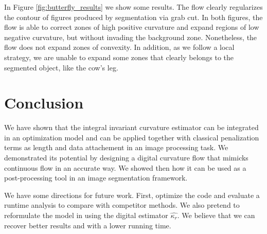 \documentclass[runningheads]{llncs}
\begin{document}
In Figure \ref{fig:butterfly_results} we show some results. The flow clearly regularizes the contour of figures produced by segmentation via grab cut. In both figures, the flow is able to correct zones of high positive curvature and expand regions of low negative curvature, but without invading the background zone. Nonetheless, the flow does not expand zones of convexity. In addition, as we follow a local strategy, we are unable to expand some zones that clearly belongs to the segmented object, like the cow's leg.

\section{Conclusion}
We have shown that the integral invariant curvature estimator can be integrated in an optimization model and can be applied together with classical penalization terms as length and data attachement in an image processing task. We demonstrated its potential by designing a digital curvature flow that mimicks continuous flow in an accurate way. We showed then how it can be used as a post-processing tool in an image segmentation framework. 

We have some directions for future work. First, optimize the code and evaluate a runtime analysis to compare with competitor methods. We also pretend to reformulate the model in \cite{schoenemann09} using the digital estimator $\hat{\kappa_r}$. We believe that we can recover better results and with a lower running time.
	
\end{document}
